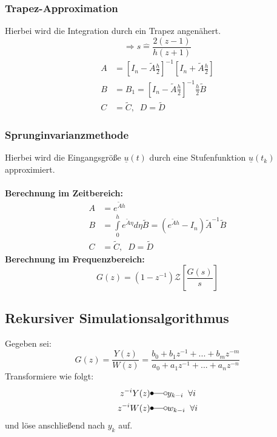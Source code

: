 \documentclass[a4paper,twocolumn,10pt]{article}
\newcommand{\entspr}{\widehat{=}}
\begin{document}
\subsubsection{Trapez-Approximation}
Hierbei wird die Integration durch ein Trapez angenähert.
\begin{equation*}
\Rightarrow s\entspr\frac{2(z-1)}{h(z+1)}
\end{equation*}
\begin{equation*}
\begin{split}
A&=\left[I_n-\tilde{A}\frac{h}{2}\right]^{-1}\left[I_n+\tilde{A}\frac{h}{2}\right]\\
B&=B_1=\left[I_n-\tilde{A}\frac{h}{2}\right]^{-1}\frac{h}{2}\tilde{B}\\
C&=\tilde{C},\;\;D=\tilde{D}
\end{split}
\end{equation*}

\subsubsection{Sprunginvarianzmethode}
Hierbei wird die Eingangsgröße $\underline{u}(t)$ durch eine Stufenfunktion $\underline{u}(t_k)$ approximiert.\\\\
\textbf{Berechnung im Zeitbereich:}
\begin{equation*}
\begin{split}
A&=e^{\tilde{A}h}\\
B&=\int\limits_0^he^{\tilde{A}\eta}d\eta\tilde{B}=\left(e^{\tilde{A}h}-I_n\right)\tilde{A}^{-1}\tilde{B}\\
C&=\tilde{C},\;\;D=\tilde{D}
\end{split}
\end{equation*}
\textbf{Berechnung im Frequenzbereich:}
\begin{equation*}
G(z)=\left(1-z^{-1}\right)\mathcal{Z}\left[\frac{G(s)}{s}\right]
\end{equation*}

\subsection{Rekursiver Simulationsalgorithmus}
Gegeben sei:
\begin{equation*}
G(z)=\frac{Y(z)}{W(z)}=\frac{b_0+b_1z^{-1}+...+b_mz^{-m}}{a_0+a_1z^{-1}+...+a_nz^{-n}}
\end{equation*}
Transformiere wie folgt:
\begin{equation*}
\begin{split}
z^{-i}Y(z)&\Laplace y_{k-i}\;\;\forall i\\
z^{-i}W(z)&\Laplace w_{k-i}\;\;\forall i
\end{split}
\end{equation*}
und löse anschließend nach $y_k$ auf.
\end{document}
